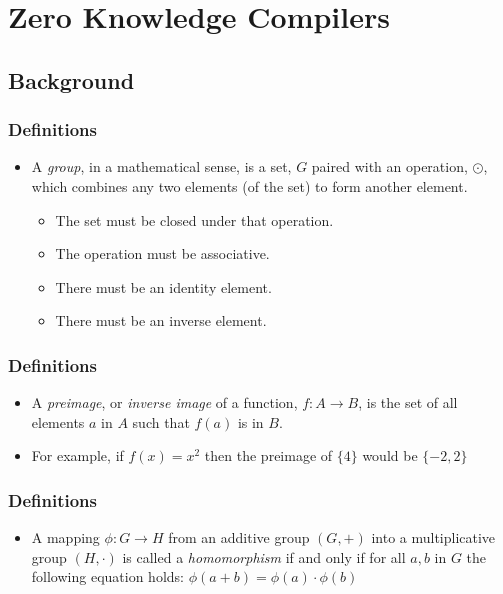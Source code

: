 \documentclass{beamer}
\begin{document}
\section{Zero Knowledge Compilers}

\subsection{Background}

\begin{frame}
	\frametitle{Definitions}
	\begin{itemize}
		\item A \textit{group}, in a mathematical sense, is a set, $G$ paired with an 
		operation, $\odot$, which combines any two elements (of the set) to form 
		another element.
		
		\begin{itemize}
			\item The set must be closed under that operation.
			\item The operation must be associative.
			\item There must be an identity element.
			\item There must be	an inverse element.
		\end{itemize}
	\end{itemize}
\end{frame}

\begin{frame}
	\frametitle{Definitions}
	\begin{itemize}
		\item A \textit{preimage}, or \textit{inverse image} of a function, 
		$f:A \rightarrow B$, is the set of all elements $a$ in $A$ such 
		that $f(a)$ is in $B$.
		
		\item For example, if $f(x) = x^{2}$ then the preimage of $\{4\}$ 
		would be $\{-2, 2\}$
	\end{itemize}
\end{frame}

\begin{frame}
	\frametitle{Definitions}
	\begin{itemize}
		\item A mapping $\phi : G \rightarrow H$ from an additive group $(G, +)$ 
		into a multiplicative group $(H, \cdot)$ is called a \textit{homomorphism} 
		if and only if for all $a, b$ in $G$ the following equation holds: 
		$\phi(a + b) = \phi(a) \cdot \phi(b)$
	\end{itemize}
\end{frame}
\end{document}
